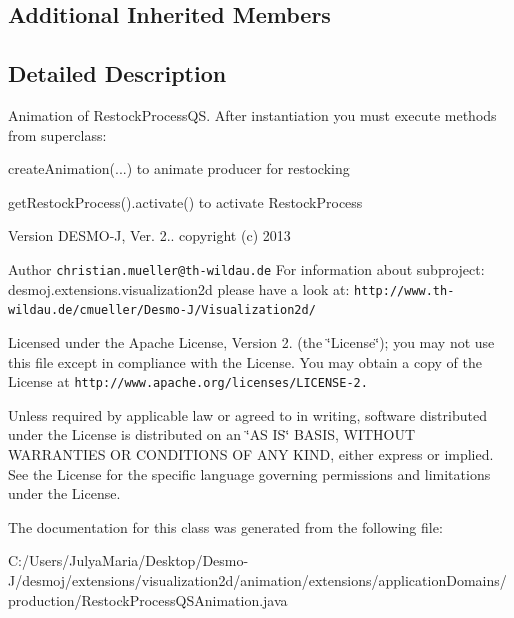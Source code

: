 \subsection*{Additional Inherited Members}


\subsection{Detailed Description}
Animation of Restock\-Process\-Q\-S. After instantiation you must execute methods from superclass\-:\par
 create\-Animation(...) to animate producer for restocking\par
 get\-Restock\-Process().activate() to activate Restock\-Process

\begin{DoxyVersion}{Version}
D\-E\-S\-M\-O-\/\-J, Ver. 2.. copyright (c) 2013 
\end{DoxyVersion}
\begin{DoxyAuthor}{Author}
{\tt christian.\-mueller@th-\/wildau.\-de} For information about subproject\-: desmoj.\-extensions.\-visualization2d please have a look at\-: {\tt http\-://www.\-th-\/wildau.\-de/cmueller/\-Desmo-\/\-J/\-Visualization2d/}
\end{DoxyAuthor}
Licensed under the Apache License, Version 2. (the \char`\"{}\-License\char`\"{}); you may not use this file except in compliance with the License. You may obtain a copy of the License at {\tt http\-://www.\-apache.\-org/licenses/\-L\-I\-C\-E\-N\-S\-E-\/2.}

Unless required by applicable law or agreed to in writing, software distributed under the License is distributed on an \char`\"{}\-A\-S I\-S\char`\"{} B\-A\-S\-I\-S, W\-I\-T\-H\-O\-U\-T W\-A\-R\-R\-A\-N\-T\-I\-E\-S O\-R C\-O\-N\-D\-I\-T\-I\-O\-N\-S O\-F A\-N\-Y K\-I\-N\-D, either express or implied. See the License for the specific language governing permissions and limitations under the License. 

The documentation for this class was generated from the following file\-:\begin{DoxyCompactItemize}
\item 
C\-:/\-Users/\-Julya\-Maria/\-Desktop/\-Desmo-\/\-J/desmoj/extensions/visualization2d/animation/extensions/application\-Domains/production/Restock\-Process\-Q\-S\-Animation.\-java\end{DoxyCompactItemize}
